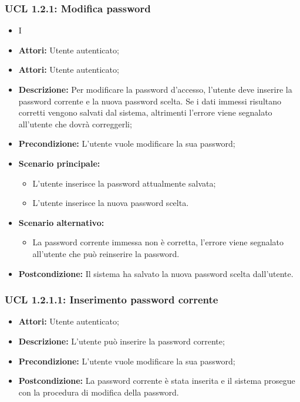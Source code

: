 \subsubsection{UCL 1.2.1: Modifica password}
\begin{itemize}
	\item I\item \textbf{Attori:} Utente autenticato;
	\item \textbf{Attori:} Utente autenticato;
	\item \textbf{Descrizione:} Per modificare la password d'accesso, l'utente deve inserire la password corrente e la nuova password scelta. Se i dati immessi risultano corretti vengono salvati dal sistema, altrimenti l'errore viene segnalato all'utente che dovrà correggerli;
	\item \textbf{Precondizione:} L'utente vuole modificare la sua password;
	\item \textbf{Scenario principale:}
	\begin{itemize}
		\item L'utente inserisce la password attualmente salvata;
		\item L'utente inserisce la nuova password scelta.
	\end{itemize}
	\item \textbf{Scenario alternativo:}
	\begin{itemize}
		\item La password corrente immessa non è corretta, l'errore viene segnalato all'utente che può reinserire la password.
	\end{itemize}
	\item \textbf{Postcondizione:} Il sistema ha salvato la nuova password scelta dall'utente.
\end{itemize}

\hypertarget{L1.2.1.1}{}
\subsubsection{UCL 1.2.1.1: Inserimento password corrente}
\begin{itemize}
	\item \textbf{Attori:} Utente autenticato;
	\item \textbf{Descrizione:} L'utente può inserire la password corrente;
	\item \textbf{Precondizione:} L'utente vuole modificare la sua password;
	\item \textbf{Postcondizione:} La password corrente è stata inserita e il sistema prosegue con la procedura di modifica della password.
\end{itemize}

